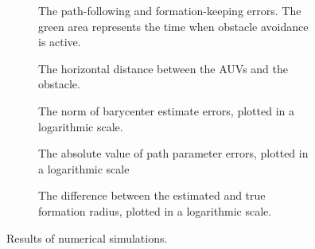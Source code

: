 \begin{figure}[htp]
    \begin{minipage}{0.48\textwidth}
        \begin{subfigure}{\textwidth}
            
            \vspace{-7mm}
            \caption{The path-following and formation-keeping errors. The green area represents the time when obstacle avoidance is active.}
            \label{fig:distr_NSB_sim_errors}
        \end{subfigure}

        \begin{subfigure}{\textwidth}
            
            \vspace{-7mm}
            \caption{The horizontal distance between the AUVs and the obstacle.}
            \label{fig:distr_NSB_sim_distance}
        \end{subfigure}
        \vspace{-7mm}
    \end{minipage}
    \hspace{\fill}
    \begin{minipage}{0.48\textwidth}
        \begin{subfigure}{\textwidth}
            
            \vspace{-7mm}
            \caption{The norm of barycenter estimate errors, plotted in a logarithmic scale.}
            \label{fig:distr_NSB_sim_barycenter}
        \end{subfigure}
    
        \begin{subfigure}{\textwidth}
            
            \vspace{-7mm}
            \caption{The absolute value of path parameter errors, plotted in a logarithmic scale}
            \label{fig:distr_NSB_sim_parameter}
        \end{subfigure}

        \begin{subfigure}{\textwidth}
            
            \vspace{-7mm}
            \caption{The difference between the estimated and true formation radius, plotted in a logarithmic scale.}
            \label{fig:distr_NSB_sim_radius}
        \end{subfigure}
        \vspace{-7mm}
    \end{minipage}

    \caption{Results of numerical simulations.}
    \label{fig:distr_NSB_simulation}
\end{figure}

